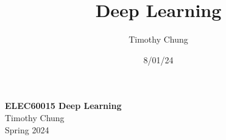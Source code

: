 \documentclass{report}
\title{Deep Learning}
\author{Timothy Chung}
\date{8/01/24}
\begin{document}


\begin{titlepage}
    \centering
    \vspace*{1cm}
    \Huge
    \textbf{ELEC60015 Deep Learning} \\
    \vspace{1cm}
    \Large
    Timothy Chung \\
    \vspace{1cm}
    Spring 2024 \\
    \vfill
\end{titlepage}

\setcounter{tocdepth}{1}
\tableofcontents
\newpage









\end{document}
